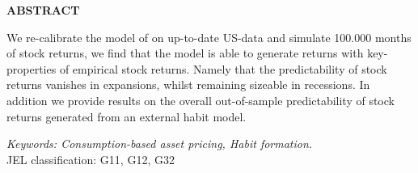 \bigskip

\centerline{\bf ABSTRACT}

\begin{doublespace}  %
  \noindent We re-calibrate the model of \citet{Campbell1999} on up-to-date US-data and simulate 100.000 months of stock returns, we find that the model is able to generate returns with key-properties of empirical stock returns. Namely that the predictability of stock returns vanishes in expansions, whilst remaining sizeable in recessions. In addition we provide results on the overall out-of-sample predictability of stock returns generated from an external habit model.
\end{doublespace}

\medskip

\noindent \textit{Keywords: Consumption-based asset pricing, Habit formation.} \\

\noindent JEL classification: G11, G12, G32

           
  